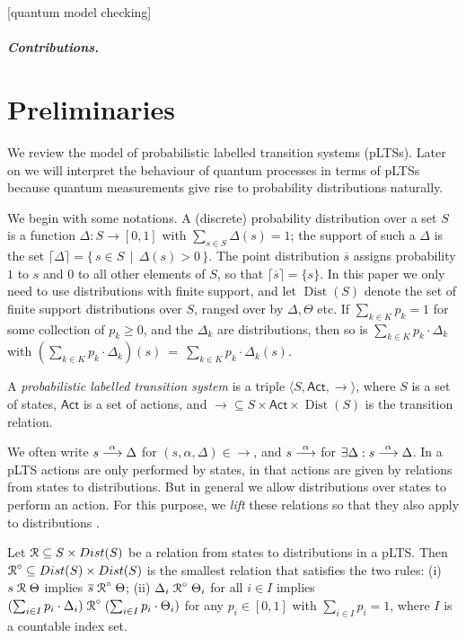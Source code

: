 \documentclass[a4paper,UKenglish,cleveref, autoref]{lipics-v2019}
\newcommand{\dist}[1]{\mathop{Dist} ({#1})   } %
\newcommand{\pdist}[1]{\overline{#1}  } %
\newcommand{\support}[1]{\lceil{#1}\rceil}
\newcommand{\lift}[1]{\mathrel{{#1}^\circ}}
\newcommand{\Act}{\ensuremath{\mathsf{Act}}\xspace}
\newcommand{\setof}[2]{\{ \, #1 \, \mid \, #2 \, \}}%
\begin{document}
[quantum model checking]

\subparagraph*{Contributions.} 

\section{Preliminaries}
\label{sec:plts}
We review the model of probabilistic labelled
transition systems (pLTSs). Later on we will interpret the behaviour
of quantum processes in terms of pLTSs because quantum measurements give rise to probability distributions naturally.

We begin with some notations. A (discrete) probability distribution
over a set $S$ is a function $\Delta : S \rightarrow [0, 1] $ with
$\sum_{s\in S} \Delta(s) = 1$; the support of such a $\Delta$ is
the set $\support{\Delta} = \setof{s \in S}{\Delta(s) > 0}$.
The point distribution $\pdist{s}$ assigns probability
$1$ to $s$ and $0$ to all other elements of $S$, so that
$\support{\pdist{s}} = \{s\}$. In this paper we only need to use distributions with finite support, and let $\dist{S}$ denote the set of
finite support distributions over $S$, ranged over by $\Delta,\Theta$ etc.
If $\sum_{k \in K} p_k = 1$ for some
collection of  $p_k \geq 0$, and the $\Delta_k$ are distributions,
then so is $\sum_{k \in K}p_k \cdot \Delta_k$ with
$(\sum_{k \in K}p_k \cdot \Delta_k)(s)~=~\sum_{k\in K} p_k\cdot \Delta_k(s).$


\begin{definition}\label{def:LTS}
	A \emph{probabilistic labelled transition system}
	is a triple
	$\langle S, \Act,  \rightarrow  \rangle$, where
	$S$ is a set of states,
	$\Act$ is a set of actions, and $\rightarrow \subseteq
	S \times \Act \times \dist{S}$ is the transition relation.
\end{definition}

We often write $s\mathrel{\stackrel{\alpha}{\longrightarrow}}\Delta$ for $(s,\alpha,\Delta)\in\rightarrow$, and $s\mathrel{\stackrel{\alpha}{\longrightarrow}}$ for $\exists \Delta: s\mathrel{\stackrel{\alpha}{\longrightarrow}}\Delta$.
In a pLTS actions are only performed by states, in that actions are
given by relations from states to distributions. But in general we
allow distributions over states to perform an action. For this
purpose, we \emph{lift} these relations so that they also apply to
distributions \cite{DGHM09}.
\begin{definition}\label{def:lift}
	Let  $\mathord{\aRel} \subseteq
	S\times\dist{S}$ be a relation from states to distributions in a pLTS.
	Then $\mathord{\lift{\aRel}} \subseteq \dist{S} \times
	\dist{S}$ is the smallest relation that satisfies the two rules:
	(i) $s \mathrel{{\mathcal R }} \Theta$ implies $\pdist{s} \lift{\aRel} \Theta$;
	(ii) $\Delta_i \lift{\aRel} \Theta_i$ for all $i\in I$ implies
	$(\sum_{i\in I}p_i\cdot\Delta_i)\lift{\aRel}(\sum_{i\in I}p_i\cdot\Theta_i)$
	for any $p_i \in [0,1]$ with $\sum_{i\in I}p_i = 1$, where $I$ is a
	countable index set.
\end{definition}
\noindent
\end{document}
